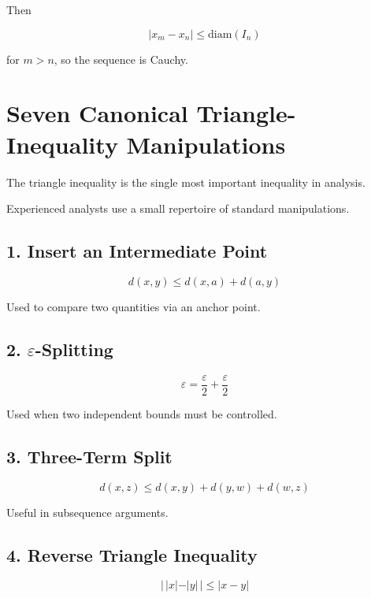 Then

\[
|x_m-x_n| \le \text{diam}(I_n)
\]

for \(m>n\), so the sequence is Cauchy.

\bigskip

\section{Seven Canonical Triangle-Inequality Manipulations}

The triangle inequality is the single most important inequality in
analysis.

Experienced analysts use a small repertoire of standard manipulations.

\bigskip

\subsection*{1. Insert an Intermediate Point}

\[
d(x,y)
\le
d(x,a)+d(a,y)
\]

Used to compare two quantities via an anchor point.

\bigskip

\subsection*{2. $\varepsilon$-Splitting}

\[
\varepsilon
=
\frac{\varepsilon}{2}
+
\frac{\varepsilon}{2}
\]

Used when two independent bounds must be controlled.

\bigskip

\subsection*{3. Three-Term Split}

\[
d(x,z)
\le
d(x,y)+d(y,w)+d(w,z)
\]

Useful in subsequence arguments.

\bigskip

\subsection*{4. Reverse Triangle Inequality}

\[
|\,|x|-|y|\,|
\le
|x-y|
\]


